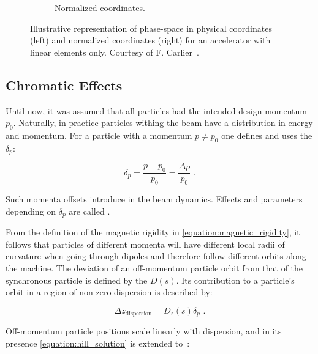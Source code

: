 \begin{figure}[!hbt]
\begin{subfigure}[b]{0.45\textwidth}
        \caption{Normalized coordinates.}
        \label{fig:phase_space_normalized}
    \end{subfigure}
    \caption{Illustrative representation of phase-space in physical coordinates (left) and normalized coordinates (right) for an accelerator with linear elements only. Courtesy of F. Carlier~\cite{PHD:Carlier}.}
    \label{figure:phase_space_linear_physical_normalized_coordinates}
\end{figure}

\subsection{Chromatic Effects}
\label{subsection:chromatic_effects}

Until now, it was assumed that all particles had the intended design momentum \(p_{0}\).
Naturally, in practice particles withing the beam have a distribution in energy and momentum.
For a particle with a momentum \(p \neq p_{0}\) one defines and uses the  \(\delta_p\):

\begin{equation}
    \delta_p = \frac{p - p_0}{p_0} = \frac{\Delta p}{p_0} \text{ .}
    \label{equation:momentum_deviation}
\end{equation}

Such momenta offsets introduce  in the beam dynamics.
Effects and parameters depending on \(\delta_p\) are called .

From the definition of the magnetic rigidity in \cref{equation:magnetic_rigidity}, it follows that particles of different momenta will have different local radii of curvature when going through dipoles and therefore follow different orbits along the machine.
The deviation of an off-momentum particle orbit from that of the synchronous particle is defined by the  \(D(s)\).
Its contribution to a particle's orbit in a region of non-zero dispersion is described by:

\begin{equation}
    \Delta z_{\mathrm{dispersion}} = D_z(s) \delta_p \text{ .}
    \label{equation:dispersion_contribution_to_orbit}
\end{equation}
\bigbreak

Off-momentum particle positions scale linearly with dispersion, and in its presence \cref{equation:hill_solution} is extended to~\cite{BOOK:Wiedemann:Particle_Accelerator_Physics}:

